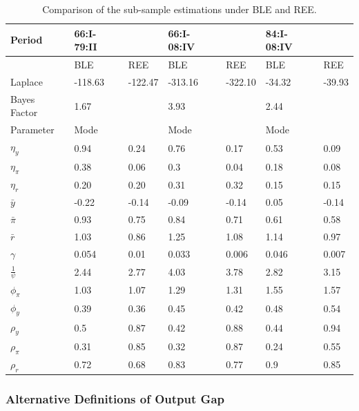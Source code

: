 \begin{table}[!htbp]
\begin{tabular}{l||ll||ll||ll}
Period & 66:I-79:II &  & 66:I-08:IV & & 84:I-08:IV \\
\hline
\hline
 & BLE & REE & BLE & REE & BLE & REE\\
Laplace & -118.63 & -122.47 & -313.16 & -322.10 & -34.32 & -39.93 \\
\hline
Bayes Factor & 1.67 &  & 3.93 &  & 2.44 & \\
\hline
\hline
Parameter & Mode &  &Mode  &   & Mode \\
\hline
\hline
$\eta_y$ &    0.94 & 0.24 &     0.76 & 0.17 &   0.53 & 0.09\\
$\eta_{\pi}$ & 0.38 & 0.06 & 0.3 & 0.04 &       0.18 & 0.08\\
$\eta_r$     & 0.20 & 0.20 & 0.31 & 0.32 &      0.15 & 0.15\\
$\bar{y}$ & -0.22 & -0.14 &   -0.09 & -0.14 &    0.05 & -0.14\\
$\bar{\pi}$ & 0.93 & 0.75 &     0.84 & 0.71 &   0.61 & 0.58 \\
$\bar{r}$ & 1.03 & 0.86 &    1.25 & 1.08 &      1.14 & 0.97\\
$\gamma$ & 0.054 & 0.01 &     0.033 & 0.006 &   0.046 & 0.007\\
$\frac{1}{\psi}$ & 2.44 &   2.77 & 4.03 & 3.78 & 2.82 & 3.15\\
$\phi_{\pi}$ & 1.03 & 1.07 & 1.29 & 1.31 &      1.55 & 1.57\\
$\phi_y$ & 0.39 & 0.36 &     0.45 & 0.42 &      0.48 & 0.54\\
$\rho_y$ & 0.5 & 0.87 &     0.42 & 0.88 &       0.44 & 0.94\\
$\rho_{\pi}$ & 0.31 & 0.85 & 0.32 & 0.87 &      0.24 & 0.55\\
$\rho_r$ & 0.72 & 0.68 &     0.83 & 0.77 &      0.9 & 0.85\\
\end{tabular}
\caption{Comparison of the sub-sample estimations under BLE and REE.}
\label{nkm_subsample}
\end{table} 


\subsubsection*{Alternative Definitions of Output Gap}

